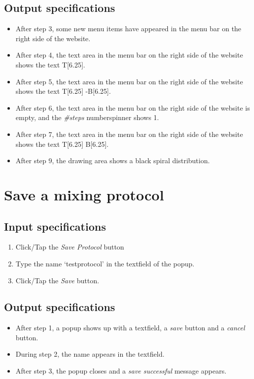 \subsection*{Output specifications}
\begin{itemize}
\item After step 3, some new menu items have appeared in the menu bar on the right side of the website.
\item After step 4, the text area in the menu bar on the right side of the website shows the text T[6.25].
\item After step 5, the text area in the menu bar on the right side of the website shows the text T[6.25] -B[6.25].
\item After step 6, the text area in the menu bar on the right side of the website is empty, and the \emph{\#steps} numberspinner shows 1.
\item After step 7, the text area in the menu bar on the right side of the website shows the text T[6.25] B[6.25].
\item After step 9, the drawing area shows a black spiral distribution.
\end{itemize}

\section{Save a mixing protocol}

\subsection*{Input specifications}
\begin{enumerate}
\item Click/Tap the \emph{Save Protocol} button
\item Type the name `testprotocol' in the textfield of the popup.
\item Click/Tap the \emph{Save} button.
\end{enumerate}

\subsection*{Output specifications}
\begin{itemize}
\item After step 1, a popup shows up with a textfield, a \emph{save} button and a \emph{cancel} button.
\item During step 2, the name appears in the textfield.
\item After step 3, the popup closes and a \emph{save successful} message appears.
\end{itemize}

